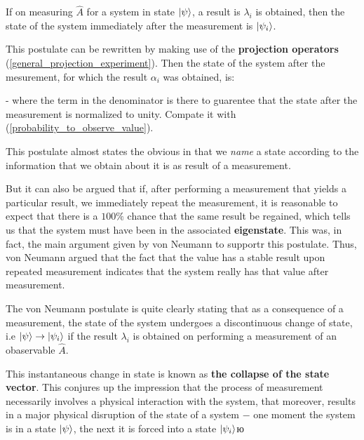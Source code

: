 \documentclass{article}
\begin{document}
If on measuring $\hat{A}$ for a system in state $\ket{\psi}$, a result is $\lambda_i$ is obtained, then the state of the system immediately after the measurement is $\ket{\psi_i}$.

This postulate can be rewritten by making use of the \textbf{projection operators} (\ref{general_projection_experiment}). Then the state of the system after the mesurement, for which the result $\alpha_i$ was obtained, is:


- where the term in the denominator is there to guarentee that the state after the measurement is normalized to unity.
Compate it with (\ref{probability_to_observe_value}).


This postulate almost states the obvious in that we \textit{name} a state according to the information that we obtain about it is as result of a measurement.

But it can also be argued that if, after performing a measurement that yields a particular result, we immediately repeat the measurement, it is reasonable to expect that there is a $100 \%$ chance that the same result be regained, which tells us that the system must have been in the associated \textbf{eigenstate}. This was, in fact, the main argument given by von Neumann to supportr this postulate. Thus, von Neumann argued that the fact that the value has a stable result upon repeated measurement indicates that the system really has that value after measurement.


The von Neumann postulate is quite clearly stating that as a consequence of a measurement, the
state of the system undergoes a discontinuous change of state, i.e $\ket{\psi} \rightarrow \ket{\psi_i}$ if the result $\lambda_i$ is obtained on performing a measurement of an obaservable $\hat{A}$.

This instantaneous change in state is
known as \textbf{the collapse of the state vector}. This conjures up the impression that the process of
measurement necessarily involves a physical interaction with the system, that moreover, results in
a major physical disruption of the state of a system $-$ one moment the system is in a state $\ket{\psi}$, the next it is forced into a state $\ket{\psi_i}$ю
\end{document}
